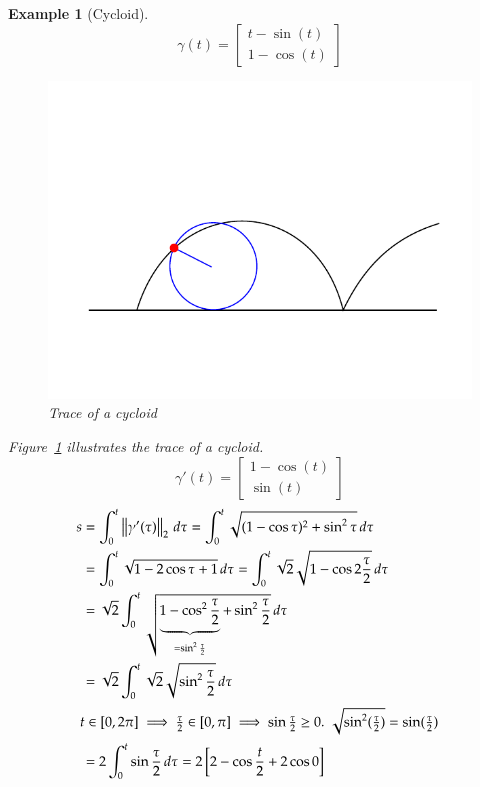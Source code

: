 \documentclass{article}
\newtheorem{example}{Example}  \numberwithin{example}{section}
\newcommand{\norm}[1]{\left\|#1\right\|}
\begin{document}
\begin{example}[Cycloid]
  \[ \gamma(t) = \begin{bmatrix} t - \sin(t) \\ 1 - \cos(t) \end{bmatrix} \]
  \begin{figure}
    \begin{center}
      \includegraphics{img/48_cycloid.pdf}
      \caption{Trace of a cycloid}
      \label{img:cycloid}
    \end{center}
  \end{figure}
  Figure~\ref{img:cycloid} illustrates the trace of a cycloid.
  \[ \gamma'(t) = \begin{bmatrix} 1 - \cos(t) \\ \sin(t) \end{bmatrix} \]
  \begin{align*}
    s &= \int_0^t \norm{\gamma'(\tau)}_2 \, d\tau = \int_0^t \sqrt{(1 - \cos\tau)^2 + \sin^2 \tau} \, d\tau \\
      &= \int_0^t \sqrt{1 - 2 \cos \tau + 1} \, d\tau = \int_0^t \sqrt2 \sqrt{1 - \cos2 \frac{\tau}{2}} \, d\tau \\
      &= \sqrt{2} \int_0^t \sqrt{\underbrace{1 - \cos^2{\frac\tau2}}_{= \sin^2{\frac\tau2}} + \sin^2{\frac\tau2}} \, d\tau \\
      &= \sqrt{2} \int_0^t \sqrt{2} \sqrt{\sin^2{\frac\tau2}} \, d\tau \\
    \intertext{
      $t \in [0, 2\pi] \implies \frac\tau2 \in [0, \pi] \implies \sin\frac\tau2 \geq 0$.
      $\sqrt{\sin^2(\frac\tau2)} = \sin(\frac\tau2)$
    }
      &= 2 \int_0^t \sin{\frac\tau2} \, d\tau = 2 \left[2 - \cos \frac{t}{2} + 2 \cos 0\right] \\

\end{align*}
\end{example}
\end{document}
